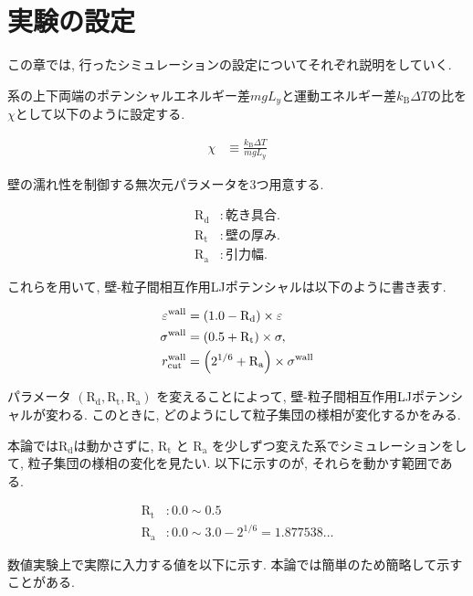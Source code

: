 \chapter{実験の設定}\label{sec:simulation}

この章では, 行ったシミュレーションの設定についてそれぞれ説明をしていく.

系の上下両端のポテンシャルエネルギー差$mgL_y$と運動エネルギー差$k_{\text{B}}\Delta T$の比を$\chi$として以下のように設定する.

\begin{align}
  \chi &\equiv \frac{k_{\text{B}}\Delta T}{mgL_{y}}
\end{align}

壁の濡れ性を制御する無次元パラメータを3つ用意する.

\begin{align}
  \text{R}_\text{d} &: 乾き具合. \\
  \text{R}_\text{t} &: 壁の厚み. \\
  \text{R}_\text{a} &: 引力幅.
\end{align}

これらを用いて, 壁-粒子間相互作用LJポテンシャルは以下のように書き表す.

\begin{align}
  \varepsilon^{\text{wall}} &= \qty(1.0 - \text{R}_\text{d}) \times \varepsilon \\
  \sigma^{\text{wall}} &= \qty(0.5 + \text{R}_\text{t}) \times \sigma , \\
  r^{\text{wall}}_{\text{cut}} &= \qty(2^{1/6} + \text{R}_\text{a}) \times \sigma^{\text{wall}} 
\end{align}

パラメータ $(\text{R}_\text{d}, \text{R}_\text{t}, \text{R}_\text{a})$ を変えることによって, 壁-粒子間相互作用LJポテンシャルが変わる. このときに, どのようにして粒子集団の様相が変化するかをみる.

本論では$\text{R}_\text{d}$は動かさずに, $\text{R}_\text{t}$ と $\text{R}_\text{a}$ を少しずつ変えた系でシミュレーションをして, 粒子集団の様相の変化を見たい. 以下に示すのが, それらを動かす範囲である.

\begin{align}
  \text{R}_\text{t} &\colon 0.0 \sim 0.5 \\
  \text{R}_\text{a} &\colon 0.0 \sim 3.0 - 2^{1/6} = 1.877538\dots
\end{align}

数値実験上で実際に入力する値を以下に示す. 本論では簡単のため簡略して示すことがある.

